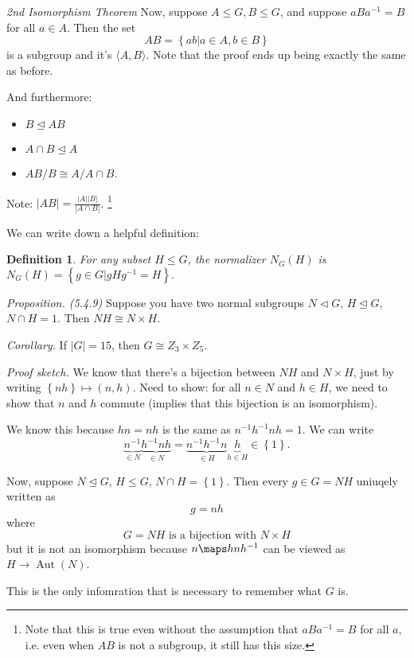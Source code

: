 \documentclass[12pt]{article}
\newtheorem*{definition}{Definition}
\DeclareMathOperator{\Aut}{Aut}
\begin{document}
{\it 2nd Isomorphism Theorem} Now, suppose $A \leq G, B \leq G$, and suppose $aBa^{-1} = B$ for all $a \in A$.  Then the set
\[
  AB = \left\{ ab | a \in A, b \in B \right\}
\]
is a subgroup and it's $\langle A, B \rangle$.  Note that the proof ends up being exactly the same as before.

And furthermore:
\begin{itemize}
  \item $B \trianglelefteq AB$
  \item $A \cap B \trianglelefteq A$
  \item $AB / B \cong A / A \cap B$.
\end{itemize}

Note: $|AB| = \frac{|A| |B|}{ |A \cap B|}$.  \footnote{Note that this is true even without the assumption that $aBa^{-1} = B$ for all $a$, i.e. even when $AB$ is not a subgroup, it still has this size.}

We can write down a helpful definition:

\begin{definition}
  For any subset $H \leq G$, the normalizer $N_G(H)$ is $N_G(H) = \left\{ g \in G | gHg^{-1} = H \right\}.$
\end{definition}

{\it Proposition. (5.4.9)}  Suppose you have two normal subgroups $N \triangleleft G$, $H \trianglelefteq G$, $N \cap H = 1$.  Then $NH \cong N \times H$.

{\it Corollary.} If $|G| = 15$, then $G \cong Z_3 \times Z_5$.

{\it Proof sketch.} We know that there's a bijection between $NH$ and $N \times H$, just by writing $\left\{ nh \right\} \mapsto (n, h)$.  Need to show: for all $n \in N$ and $h \in H$, we need to show that $n$ and $h$ commute (implies that this bijection is an isomorphism).

We know this because $hn = nh$ is the same as $n^{-1} h^{-1} nh = 1$.  We can write
\[
  \underbrace{n^{-1}}_{\in N} \underbrace{h^{-1} nh}_{\in N}  = \underbrace{n^{-1} h^{-1} n}_{\in H}\underbrace{h}_{h \in H} \in \left\{ 1 \right\}.
\]

Now, suppose $N \trianglelefteq G$, $H \leq G$, $N \cap H = \left\{ 1 \right\}$.  Then every $g \in G = NH$ uniuqely written as
\[
  g = nh
\]
where 
\[
  G = NH \text{ is a bijection with } N \times H
\]
but it is not an isomorphism because $n \maps hnh^{-1}$ can be viewed as $H \to \Aut(N)$.

This is the only infomration that is necessary to remember what $G$ is.
\end{document}
